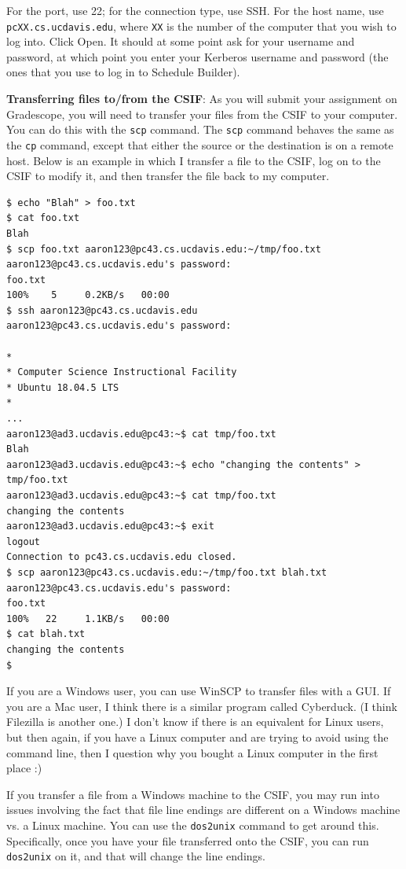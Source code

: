 \documentclass{article}
\begin{document}
For the port, use 22; for the connection type, use SSH. For the host name, use \lstinline{pcXX.cs.ucdavis.edu}, where \lstinline{XX} is the number of the computer that you wish to log into. Click Open. It should at some point ask for your username and password, at which point you enter your Kerberos username and password (the ones that you use to log in to Schedule Builder).

\textbf{Transferring files to/from the CSIF}: As you will submit your assignment on Gradescope, you will need to transfer your files from the CSIF to your computer. You can do this with the \lstinline{scp} command. The \lstinline{scp} command behaves the same as the \lstinline{cp} command, except that either the source or the destination is on a remote host. Below is an example in which I transfer a file to the CSIF, log on to the CSIF to modify it, and then transfer the file back to my computer.

\begin{lstlisting}
$ echo "Blah" > foo.txt
$ cat foo.txt 
Blah
$ scp foo.txt aaron123@pc43.cs.ucdavis.edu:~/tmp/foo.txt
aaron123@pc43.cs.ucdavis.edu's password: 
foo.txt                                                            100%    5     0.2KB/s   00:00    
$ ssh aaron123@pc43.cs.ucdavis.edu
aaron123@pc43.cs.ucdavis.edu's password: 

*
* Computer Science Instructional Facility
* Ubuntu 18.04.5 LTS
*
...
aaron123@ad3.ucdavis.edu@pc43:~$ cat tmp/foo.txt 
Blah
aaron123@ad3.ucdavis.edu@pc43:~$ echo "changing the contents" > tmp/foo.txt 
aaron123@ad3.ucdavis.edu@pc43:~$ cat tmp/foo.txt 
changing the contents
aaron123@ad3.ucdavis.edu@pc43:~$ exit
logout
Connection to pc43.cs.ucdavis.edu closed.
$ scp aaron123@pc43.cs.ucdavis.edu:~/tmp/foo.txt blah.txt
aaron123@pc43.cs.ucdavis.edu's password: 
foo.txt                                                            100%   22     1.1KB/s   00:00    
$ cat blah.txt 
changing the contents
$ 
\end{lstlisting}

If you are a Windows user, you can use WinSCP to transfer files with a GUI. If you are a Mac user, I think there is a similar program called Cyberduck. (I think Filezilla is another one.) I don't know if there is an equivalent for Linux users, but then again, if you have a Linux computer and are trying to avoid using the command line, then I question why you bought a Linux computer in the first place :)

If you transfer a file from a Windows machine to the CSIF, you may run into issues involving the fact that file line endings are different on a Windows machine vs. a Linux machine. You can use the \lstinline{dos2unix} command to get around this. Specifically, once you have your file transferred onto the CSIF, you can run \lstinline{dos2unix} on it, and that will change the line endings.
\end{document}
